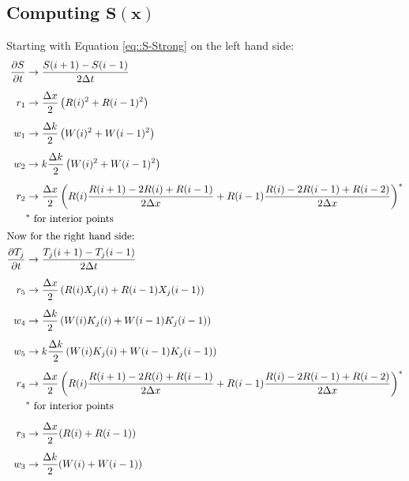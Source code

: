 \documentclass{article}
\def\pd{\partial}
\begin{document}
\subsection{Computing $\mathbf{S(x)}$}
Starting with Equation \ref{eq::S-Strong} on the left hand side:
\begin{subequations}
\begin{align*}
\frac{\pd S}{\pd t} &\to \frac{S(i+1) - S(i-1)}{2\Delta t} \\[5pt]
r_1 &\to \frac{\Delta x}{2} \left( R(i)^2 + R(i-1)^2 \right) \\[5pt]
w_1 &\to \frac{\Delta k}{2} \left( W(i)^2 + W(i-1)^2 \right) \\[5pt]
w_2 &\to k\frac{\Delta k}{2}\left( W(i)^2 + W(i-1)^2 \right) \\[5pt]
r_2 &\to \frac{\Delta x}{2} \left( R(i) \frac{R(i+1)-2R(i)+R(i-1)}{2\Delta x} + R(i-1) \frac{R(i)-2R(i-1)+R(i-2)}{2\Delta x} \right)^*\\
      & \text{$^*$ for interior points} \\
\intertext{Now for the right hand side:}
\frac{\pd T_j}{\pd t} &\to \frac{T_j(i+1)-T_j(i-1)}{2\Delta t} \\[5pt]
r_5 &\to \frac{\Delta x}{2} \left( R(i)X_j(i) + R(i-1)X_j(i-1) \right) \\[5pt]
w_4 &\to \frac{\Delta k}{2} \left( W(i)K_j(i) + W(i-1)K_j(i-1) \right) \\[5pt]
w_5 &\to k\frac{\Delta k}{2} \left( W(i)K_j(i) + W(i-1)K_j(i-1) \right) \\[5pt]
r_4 &\to \frac{\Delta x}{2} \left( R(i)\frac{R(i+1)-2R(i)+R(i-1)}{2\Delta x} + R(i-1)\frac{R(i)-2R(i-1)+R(i-2)}{2\Delta x} \right)^*\\
      &\text{$^*$ for interior points} \\[5pt]
r_3  &\to \frac{\Delta x}{2} (R(i) + R(i-1)) \\[5pt]
w_3 &\to \frac{\Delta k}{2} (W(i) + W(i-1))
\end{align*}
\end{subequations}
\end{document}
